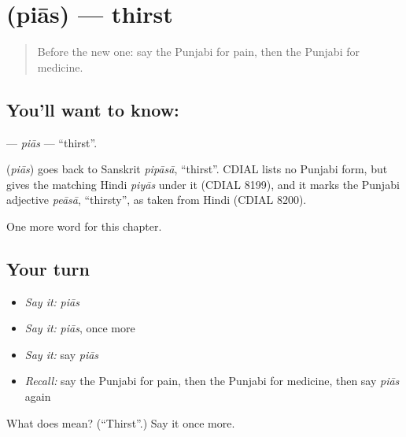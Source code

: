 \section[\texorpdfstring{\pa{ਪਿਆਸ} (piās)}{ਪਿਆਸ (piās)}]{ (piās) — thirst}

\label{lesson:PA-C52-pias}



\begin{quote}
Before the new one: say the Punjabi for pain, then the Punjabi for medicine.
\end{quote}

\subsection*{You'll want to know: }
\textbf{} — \emph{piās} — \textquotedblleft{}thirst\textquotedblright{}.

\begin{cousinweb}
\textbf{} (\emph{piās}) goes back to Sanskrit \emph{pipāsā}, \textquotedblleft{}thirst\textquotedblright{}. CDIAL lists no Punjabi form, but gives the matching Hindi \emph{piyās} under it (CDIAL 8199), and it marks the Punjabi adjective \emph{peāsā}, \textquotedblleft{}thirsty\textquotedblright{}, as taken from Hindi (CDIAL 8200).
\end{cousinweb}

\begin{grammarlens}[title={What you've built}]
One more word for this chapter.
\end{grammarlens}

\subsection*{Your turn}
\begin{itemize}
\raggedright
  \item \emph{Say it:} \emph{piās}
  \item \emph{Say it:} \emph{piās}, once more
  \item \emph{Say it:} say \emph{piās}
  \item \emph{Recall:} say the Punjabi for pain, then the Punjabi for medicine, then say \emph{piās} again
\end{itemize}

\begin{tcolorbox}[breakable,colback=teal!4,colframe=teal!35!black,title={Before you move on}]
What does  mean? (\textquotedblleft{}Thirst\textquotedblright{}.) Say it once more.
\end{tcolorbox}

